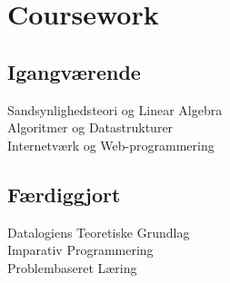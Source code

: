 \documentclass[]{plushcv}
\begin{document}
\begin{minipage}[t]{0.25\textwidth}


\section{Coursework}

\subsection{Igangværende}
Sandsynlighedsteori og Linear Algebra \textbullet{}\\
Algoritmer og Datastrukturer \textbullet{}\\
Internetværk og Web-programmering\\

 \subsection{Færdiggjort}

Datalogiens Teoretiske Grundlag \textbullet{}\\
Imparativ Programmering \textbullet{}\\
Problembaseret Læring\\


\end{minipage} 
\end{document}
